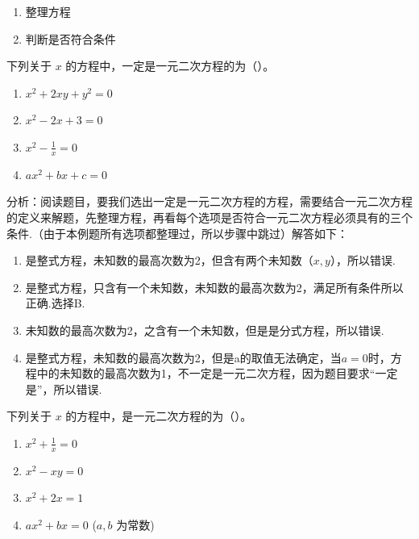 \documentclass[lang=cn, 10pt, titlestyle=hang, oneside]{elegantbook}
\begin{document}
\begin{enumerate}
    \item 整理方程
    \item 判断是否符合条件
\end{enumerate}
\begin{example}
    下列关于 \( x \) 的方程中，一定是一元二次方程的为（{\hspace{3.5em}}）。
    \begin{enumerate}[label=\Alph*.]
        \item \( x^2 + 2xy + y^2 = 0 \)
        \item \( x^2 - 2x + 3 = 0 \)
        \item \( x^2 - \frac{1}{x} = 0 \)
        \item \( ax^2 + bx + c = 0 \)
    \end{enumerate}
\end{example}



\begin{solution}
    分析：阅读题目，要我们选出一定是一元二次方程的方程，需要结合一元二次方程的定义来解题，先整理方程，再看每个选项是否符合一元二次方程必须具有的三个条件.（由于本例题所有选项都整理过，所以步骤中跳过）解答如下：
    \begin{enumerate}[label=\Alph*.]
        \item 是整式方程，未知数的最高次数为2，但含有两个未知数（\(x,y\)），所以错误.
        \item 是整式方程，只含有一个未知数，未知数的最高次数为2，满足所有条件所以正确.选择B.
        \item 未知数的最高次数为2，之含有一个未知数，但是是分式方程，所以错误.
        \item 是整式方程，未知数的最高次数为2，但是a的取值无法确定，当\(a=0\)时，方程中的未知数的最高次数为1，不一定是一元二次方程，因为题目要求“一定是”，所以错误.
    \end{enumerate}
\end{solution}

\begin{exercise}
    \newline
        下列关于 \( x \) 的方程中，是一元二次方程的为（{\hspace{3em}}）。
        \begin{enumerate}[label=\Alph*.]
            \item \( x^2 + \frac{1}{x} = 0 \)
            \item \( x^2 - xy = 0 \)
            \item \( x^2 + 2x = 1 \)
            \item \( ax^2 + bx = 0 \) (\( a, b \) 为常数)
        \end{enumerate}
\end{exercise}
\end{document}
